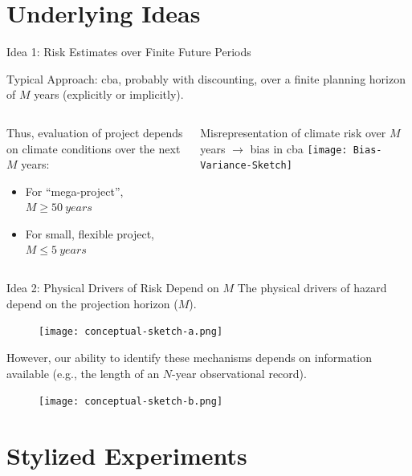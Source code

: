 \documentclass[
  10pt,     %
  handout   %
]{beamer}
\makeatletter
\newcommand*{\eg}{e.g.\@\xspace}
\makeatother
\begin{document}
\section{Underlying Ideas}

\begin{frame}{Idea 1: Risk Estimates over Finite Future Periods}
  \begin{alertblock}{Typical Approach:}
    \gls{cba}, probably with discounting, over a \alert{finite} planning horizon of $M$ years (explicitly or implicitly).
  \end{alertblock}
  \begin{columns}
    \pause
    \begin{column}{0.5\textwidth}
      Thus, evaluation of project depends on climate conditions over the next $M$ years:
      \begin{itemize}
        \item For ``mega-project'', $M \geq \SI{50}{years}$
        \item For small, flexible project, $M \leq \SI{5}{years}$
      \end{itemize}
    \end{column}
    \pause
    \begin{column}{0.5\textwidth}
      Misrepresentation of climate risk over $M$ years $\rightarrow$ bias in \gls{cba}
      \texttt{[image: Bias-Variance-Sketch]}
    \end{column}
  \end{columns}
\end{frame}

\begin{frame}{Idea 2: Physical Drivers of Risk Depend on $M$}
  The physical drivers of hazard depend on the projection horizon ($M$).
  \begin{figure}
    \centering
    \texttt{[image: conceptual-sketch-a.png]}\\
  \end{figure}
  \pause
  However, our ability to identify these mechanisms depends on information available (\eg, the length of an $N$-year observational record).
  \begin{figure}
    \centering
    \texttt{[image: conceptual-sketch-b.png]}
  \end{figure}
\end{frame}

\section{Stylized Experiments}
\end{document}
